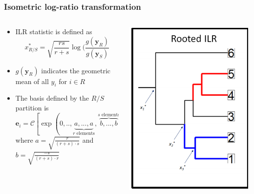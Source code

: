 \documentclass{beamer}
\begin{document}
\begin{frame}
    \frametitle{Isometric log-ratio transformation}
    \begin{columns}
        \begin{column}{0.6\textwidth}
            \begin{itemize}
                \item ILR statistic is defined as 
                \begin{equation}
                    x^*_{R/S} = \sqrt{\frac{rs}{r+s}} \log(\frac{g(\bm{y}_R)}{g(\bm{y}_S)}
                \end{equation}
                \item $g(\bm{y}_R)$ indicates the geometric mean of all $y_i$ for $i \in R$ 
                \item The basis defined by the $R/S$ partition is \[\bm{e}_i = \mathcal{C}[\exp(0,..,\underbrace{a,..., a}_{r \text{ elements}},\overbrace{b,...,b}^{s \text{ elements}},...,0))] \]  
                where $a = \sqrt{\frac{r}{(r + s) \cdot s}}$ and $b = \sqrt{\frac{-s}{(r+s) \cdot r}}$
            \end{itemize}
        \end{column}
        \begin{column}{0.4\textwidth}
            \begin{center}
                \includegraphics[scale=0.3]{phylogeny_demonstration.png}
            \end{center}
        \end{column}
    \end{columns}
\end{frame}
\end{document}
